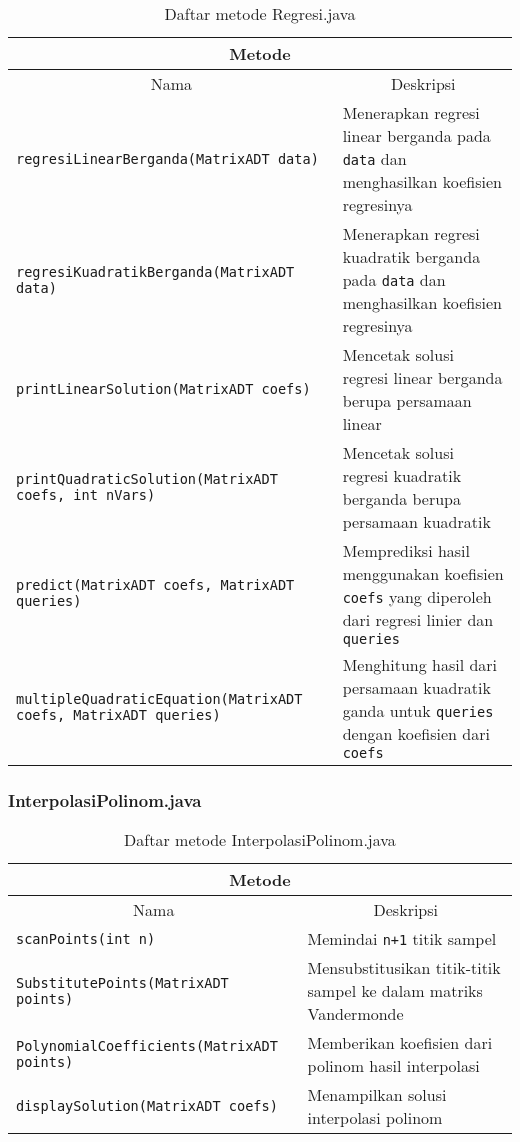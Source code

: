 \begin{table}[H]
    \centering
    \caption{Daftar metode Regresi.java}
    \begin{tabular}{p{}|p{}}
        \hline
        \hline
        \multicolumn{2}{c}{\textbf{Metode}}\\
        \hline
        \hline
         \multicolumn{1}{c|}{Nama}  & \multicolumn{1}{c}{Deskripsi} \\
         \hline 
         \hline 
         \texttt{regresiLinearBerganda(MatrixADT data)} & Menerapkan regresi linear berganda pada \verb+data+ dan menghasilkan koefisien regresinya \\[.5em]
         \texttt{regresiKuadratikBerganda(MatrixADT data)} & Menerapkan regresi kuadratik berganda pada \verb+data+ dan menghasilkan koefisien regresinya \\[.5em]
         \texttt{printLinearSolution(MatrixADT coefs)} & Mencetak solusi regresi linear berganda berupa persamaan linear \\[.5em]
         \texttt{printQuadraticSolution(MatrixADT coefs, int nVars)} & Mencetak solusi regresi kuadratik berganda berupa persamaan kuadratik \\[.5em]
         \texttt{predict(MatrixADT coefs, MatrixADT queries)} & Memprediksi hasil menggunakan koefisien \verb+coefs+ yang diperoleh dari regresi linier dan \verb+queries+ \\[.5em]
         \texttt{multipleQuadraticEquation(MatrixADT coefs, MatrixADT queries)} & Menghitung hasil dari persamaan kuadratik ganda untuk \verb+queries+ dengan koefisien dari \verb+coefs+ 
    \end{tabular}
\end{table}

\subsubsection{InterpolasiPolinom.java}

\begin{table}[H]
    \centering
    \caption{Daftar metode InterpolasiPolinom.java}
        \begin{tabular}{p{}|p{}}
        \hline
        \hline
        \multicolumn{2}{c}{\textbf{Metode}}\\
        \hline
        \hline
         \multicolumn{1}{c|}{Nama}  & \multicolumn{1}{c}{Deskripsi} \\
         \hline 
         \hline 
         \texttt{scanPoints(int n)}& Memindai \verb|n+1| titik sampel \\[.5em]
         \texttt{SubstitutePoints(MatrixADT points)}& Mensubstitusikan titik-titik sampel ke dalam matriks Vandermonde \\[.5em]
         \texttt{PolynomialCoefficients(MatrixADT points)}& Memberikan koefisien dari polinom hasil interpolasi \\[.5em]
         \texttt{displaySolution(MatrixADT coefs)}& Menampilkan solusi interpolasi polinom
    \end{tabular}
\end{table}

